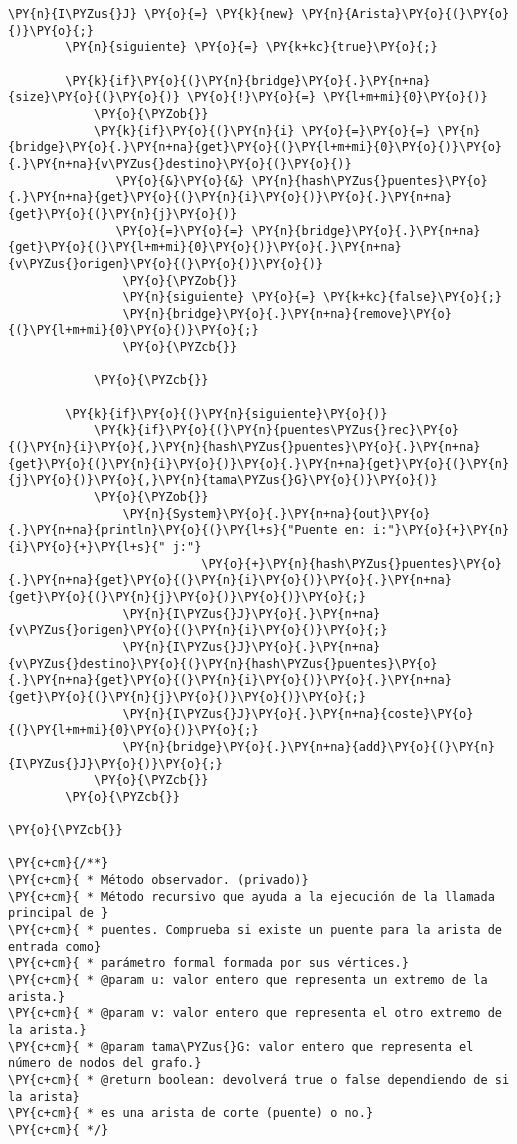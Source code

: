 \begin{Verbatim}[commandchars=\\\{\}]
		\PY{n}{I\PYZus{}J} \PY{o}{=} \PY{k}{new} \PY{n}{Arista}\PY{o}{(}\PY{o}{)}\PY{o}{;}
		\PY{n}{siguiente} \PY{o}{=} \PY{k+kc}{true}\PY{o}{;}

		\PY{k}{if}\PY{o}{(}\PY{n}{bridge}\PY{o}{.}\PY{n+na}{size}\PY{o}{(}\PY{o}{)} \PY{o}{!}\PY{o}{=} \PY{l+m+mi}{0}\PY{o}{)}
		    \PY{o}{\PYZob{}}
			\PY{k}{if}\PY{o}{(}\PY{n}{i} \PY{o}{=}\PY{o}{=} \PY{n}{bridge}\PY{o}{.}\PY{n+na}{get}\PY{o}{(}\PY{l+m+mi}{0}\PY{o}{)}\PY{o}{.}\PY{n+na}{v\PYZus{}destino}\PY{o}{(}\PY{o}{)} 
			   \PY{o}{&}\PY{o}{&} \PY{n}{hash\PYZus{}puentes}\PY{o}{.}\PY{n+na}{get}\PY{o}{(}\PY{n}{i}\PY{o}{)}\PY{o}{.}\PY{n+na}{get}\PY{o}{(}\PY{n}{j}\PY{o}{)} 
			   \PY{o}{=}\PY{o}{=} \PY{n}{bridge}\PY{o}{.}\PY{n+na}{get}\PY{o}{(}\PY{l+m+mi}{0}\PY{o}{)}\PY{o}{.}\PY{n+na}{v\PYZus{}origen}\PY{o}{(}\PY{o}{)}\PY{o}{)} 
			    \PY{o}{\PYZob{}}
				\PY{n}{siguiente} \PY{o}{=} \PY{k+kc}{false}\PY{o}{;}
				\PY{n}{bridge}\PY{o}{.}\PY{n+na}{remove}\PY{o}{(}\PY{l+m+mi}{0}\PY{o}{)}\PY{o}{;}
			    \PY{o}{\PYZcb{}}
				
		    \PY{o}{\PYZcb{}}

		\PY{k}{if}\PY{o}{(}\PY{n}{siguiente}\PY{o}{)}
		    \PY{k}{if}\PY{o}{(}\PY{n}{puentes\PYZus{}rec}\PY{o}{(}\PY{n}{i}\PY{o}{,}\PY{n}{hash\PYZus{}puentes}\PY{o}{.}\PY{n+na}{get}\PY{o}{(}\PY{n}{i}\PY{o}{)}\PY{o}{.}\PY{n+na}{get}\PY{o}{(}\PY{n}{j}\PY{o}{)}\PY{o}{,}\PY{n}{tama\PYZus{}G}\PY{o}{)}\PY{o}{)}
			\PY{o}{\PYZob{}}
			    \PY{n}{System}\PY{o}{.}\PY{n+na}{out}\PY{o}{.}\PY{n+na}{println}\PY{o}{(}\PY{l+s}{"Puente en: i:"}\PY{o}{+}\PY{n}{i}\PY{o}{+}\PY{l+s}{" j:"}
					       \PY{o}{+}\PY{n}{hash\PYZus{}puentes}\PY{o}{.}\PY{n+na}{get}\PY{o}{(}\PY{n}{i}\PY{o}{)}\PY{o}{.}\PY{n+na}{get}\PY{o}{(}\PY{n}{j}\PY{o}{)}\PY{o}{)}\PY{o}{;}
			    \PY{n}{I\PYZus{}J}\PY{o}{.}\PY{n+na}{v\PYZus{}origen}\PY{o}{(}\PY{n}{i}\PY{o}{)}\PY{o}{;}
			    \PY{n}{I\PYZus{}J}\PY{o}{.}\PY{n+na}{v\PYZus{}destino}\PY{o}{(}\PY{n}{hash\PYZus{}puentes}\PY{o}{.}\PY{n+na}{get}\PY{o}{(}\PY{n}{i}\PY{o}{)}\PY{o}{.}\PY{n+na}{get}\PY{o}{(}\PY{n}{j}\PY{o}{)}\PY{o}{)}\PY{o}{;}
			    \PY{n}{I\PYZus{}J}\PY{o}{.}\PY{n+na}{coste}\PY{o}{(}\PY{l+m+mi}{0}\PY{o}{)}\PY{o}{;}
			    \PY{n}{bridge}\PY{o}{.}\PY{n+na}{add}\PY{o}{(}\PY{n}{I\PYZus{}J}\PY{o}{)}\PY{o}{;}
			\PY{o}{\PYZcb{}}
	    \PY{o}{\PYZcb{}}	

\PY{o}{\PYZcb{}}

\PY{c+cm}{/**}
\PY{c+cm}{ * Método observador. (privado)}
\PY{c+cm}{ * Método recursivo que ayuda a la ejecución de la llamada principal de }
\PY{c+cm}{ * puentes. Comprueba si existe un puente para la arista de entrada como}
\PY{c+cm}{ * parámetro formal formada por sus vértices.}
\PY{c+cm}{ * @param u: valor entero que representa un extremo de la arista.}
\PY{c+cm}{ * @param v: valor entero que representa el otro extremo de la arista.}
\PY{c+cm}{ * @param tama\PYZus{}G: valor entero que representa el número de nodos del grafo.}
\PY{c+cm}{ * @return boolean: devolverá true o false dependiendo de si la arista}
\PY{c+cm}{ * es una arista de corte (puente) o no.}
\PY{c+cm}{ */}


\end{Verbatim}
